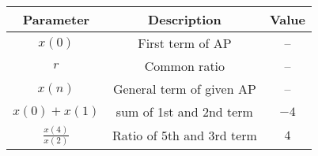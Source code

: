 \begin{tabular}{|c|c|c|}
      \hline
      Parameter & Description & Value\\\hline
      $x(0)$ & First term of AP & --\\\hline
      $r$ & Common ratio & --\\\hline
      $x(n)$ & General term of given AP & --\\\hline
      $x(0)+x(1)$ & sum of 1st and 2nd term & $-4$\\\hline
      $\displaystyle\frac{x(4)}{x(2)}$ & Ratio of 5th and 3rd term & $4$\\\hline 
\end{tabular}
